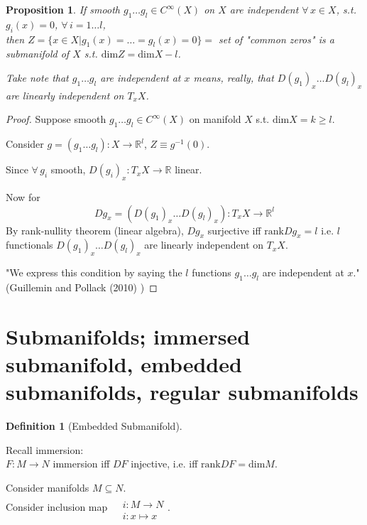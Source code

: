 \documentclass[10pt]{amsart}
\newtheorem{proposition}{Proposition}
\newtheorem{definition}{Definition}
\begin{document}
\begin{multicols*}{2}
\begin{proposition} If smooth $g_1\dots g_l \in C^{\infty}(X)$ on $X$ are independent $\forall \, x\in X$, s.t. $g_i(x)=0$, $\forall \, i = 1\dots l$, \\
	then $Z=\lbrace x\in X | g_1(x) = \dots = g_l(x)=0 \rbrace = $ set of "common zeros" is a \emph{submanifold} of $X$ s.t. $\text{dim}Z = \text{dim}X- l$.  
	
	Take \emph{note} that $g_1 \dots g_l$ are independent at $x$ means, really, that $D(g_1)_x \dots D(g_l)_x$ are linearly independent on $T_xX$.  
\end{proposition}
\begin{proof}
Suppose smooth $g_1 \dots g_l \in C^{\infty}(X)$ on manifold $X$ s.t. $\text{dim}X = k\geq l$.  

Consider $g=(g_1\dots g_l):X \to \mathbb{R}^l$, $Z\equiv g^{-1}(0)$.  

Since $\forall \, g_i$ smooth, $D(g_i)_x:T_xX \to \mathbb{R}$ linear.  

Now for 
\[
Dg_x = (D(g_1)_x \dots D(g_l)_x):T_xX \to \mathbb{R}^l
\]	
By rank-nullity theorem (linear algebra), $Dg_x$ surjective iff $\text{rank}Dg_x = l$ i.e. $l$ functionals $D(g_1)_x \dots D(g_l)_x$ are linearly independent on $T_xX$.  

"We express this condition by saying the $l$ functions $g_1\dots g_l$ are independent at $x$."  (Guillemin and Pollack (2010) \cite{VGuilleminAPollack2010})  
	
	
	\end{proof}

\section{Submanifolds; immersed submanifold, embedded submanifolds, regular submanifolds}  

\begin{definition}[Embedded Submanifold]
	
\end{definition}

Recall immersion:  \\
$F:M \to N$ immersion iff $DF$ injective, i.e. iff $\text{rank}DF = \text{dim}M$.  

Consider manifolds $M\subseteq N$.  \\
Consider inclusion map $\begin{aligned} & \quad \\ 
	& i:M\to N \\
	& i: x \mapsto x \end{aligned}$.  
	

\end{multicols*}
\end{document}
